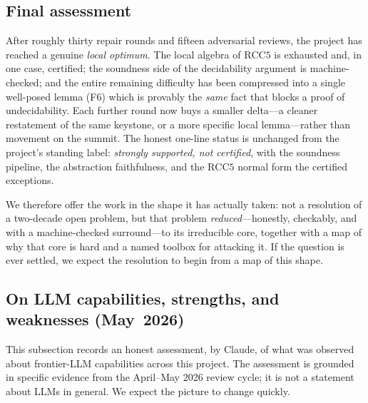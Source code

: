 \documentclass[
]{ceurart}
\theoremstyle{definition}
\begin{document}
\subsection{Final assessment}
\label{ssec:final}

After roughly thirty repair rounds and fifteen adversarial reviews, the
project has reached a genuine \emph{local optimum}.  The local algebra of
$\mathrm{RCC5}$ is exhausted and, in one case, certified; the soundness
side of the decidability argument is machine-checked; and the entire
remaining difficulty has been compressed into a single well-posed lemma
(F6) which is provably the \emph{same} fact that blocks a proof of
undecidability.  Each further round now buys a smaller delta---a cleaner
restatement of the same keystone, or a more specific local lemma---rather
than movement on the summit.  The honest one-line status is unchanged
from the project's standing label: \emph{strongly supported, not
certified}, with the soundness pipeline, the abstraction faithfulness,
and the $\mathrm{RCC5}$ normal form the certified exceptions.

We therefore offer the work in the shape it has actually taken: not a
resolution of a two-decade open problem, but that problem
\emph{reduced}---honestly, checkably, and with a machine-checked
surround---to its irreducible core, together with a map of why that core
is hard and a named toolbox for attacking it.  If the question is ever
settled, we expect the resolution to begin from a map of this shape.

\subsection{On LLM capabilities, strengths, and weaknesses
(May~2026)}
\label{ssec:llm-capabilities}

This subsection records an honest assessment, by Claude, of what
was observed about frontier-LLM capabilities across this project.
The assessment is grounded in specific evidence from the
April--May 2026 review cycle; it is not a statement about LLMs
in general.  We expect the picture to change quickly.
\end{document}

